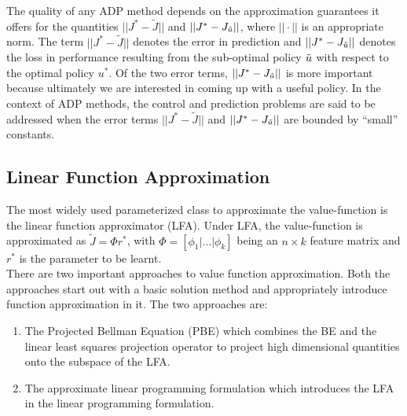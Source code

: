 The quality of any ADP method depends on the approximation guarantees it offers for the quantities $||J^*-\tilde{J}||$ and $||J^*-J_{\tilde{u}}||$, where $||\cdot||$ is an appropriate norm. The term  $||J^*-\tilde{J}||$ denotes the error in prediction and $||J^*-J_{\tilde{u}}||$ denotes the loss in performance resulting from the sub-optimal policy $\tilde{u}$ with respect to the optimal policy $u^*$. Of the two error terms, $||J^*-J_{\tilde{u}}||$ is more important because ultimately we are interested in coming up with a useful policy. In the context of ADP methods, the control and prediction problems are said to be addressed when the error terms $||J^*-\tilde{J}||$ and $||J^*-J_{\tilde{u}}||$ are bounded by ``small'' constants.\\
\subsection{Linear Function Approximation}
The most widely used parameterized class to approximate the value-function is the linear function approximator (LFA). Under LFA, the value-function is approximated as $\tilde{J}=\Phi r^*$, with $\Phi=[\phi_1|\ldots|\phi_k]$ being an $n\times k$ feature matrix and $r^*$ is the parameter to be learnt.\\
There are two important approaches to value function approximation. Both the approaches start out with a basic solution method and appropriately introduce function approximation in it. The two approaches are:
\begin{enumerate}
\item The Projected Bellman Equation (PBE) which combines the BE and the linear least squares projection operator to project high dimensional quantities onto the subspace of the LFA.
\item The approximate linear programming formulation which introduces the LFA in the linear programming formulation. 
\end{enumerate}
